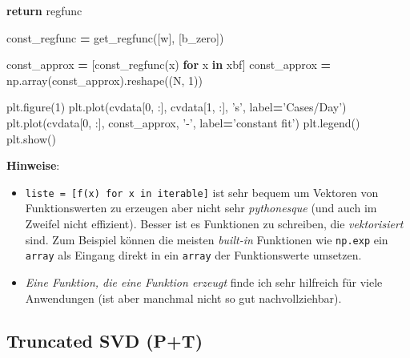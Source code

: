 \documentclass[]{book}
\newenvironment{Shaded}{\begin{snugshade}}{\end{snugshade}}
\newcommand{\ControlFlowTok}[1]{\textcolor[rgb]{0.13,0.29,0.53}{\textbf{#1}}}
\newcommand{\DecValTok}[1]{\textcolor[rgb]{0.00,0.00,0.81}{#1}}
\newcommand{\KeywordTok}[1]{\textcolor[rgb]{0.13,0.29,0.53}{\textbf{#1}}}
\newcommand{\NormalTok}[1]{#1}
\newcommand{\OperatorTok}[1]{\textcolor[rgb]{0.81,0.36,0.00}{\textbf{#1}}}
\newcommand{\StringTok}[1]{\textcolor[rgb]{0.31,0.60,0.02}{#1}}
\providecommand{\tightlist}{%
  \setlength{\itemsep}{0pt}\setlength{\parskip}{0pt}}
\theoremstyle{definition}
\theoremstyle{definition}
\theoremstyle{definition}
\theoremstyle{definition}
\theoremstyle{remark}
\begin{document}
\begin{Shaded}
\begin{Highlighting}[]
    \ControlFlowTok{return}\NormalTok{ regfunc}


\NormalTok{const_regfunc }\OperatorTok{=}\NormalTok{ get_regfunc([w], [b_zero])}

\NormalTok{const_approx }\OperatorTok{=}\NormalTok{ [const_regfunc(x) }\ControlFlowTok{for}\NormalTok{ x }\KeywordTok{in}\NormalTok{ xbf]}
\NormalTok{const_approx }\OperatorTok{=}\NormalTok{ np.array(const_approx).reshape((N, }\DecValTok{1}\NormalTok{))}

\NormalTok{plt.figure(}\DecValTok{1}\NormalTok{)}
\NormalTok{plt.plot(cvdata[}\DecValTok{0}\NormalTok{, :], cvdata[}\DecValTok{1}\NormalTok{, :], }\StringTok{'s'}\NormalTok{, label}\OperatorTok{=}\StringTok{'Cases/Day'}\NormalTok{)}
\NormalTok{plt.plot(cvdata[}\DecValTok{0}\NormalTok{, :], const_approx, }\StringTok{'-'}\NormalTok{, label}\OperatorTok{=}\StringTok{'constant fit'}\NormalTok{)}
\NormalTok{plt.legend()}
\NormalTok{plt.show()}
\end{Highlighting}
\end{Shaded}

\textbf{Hinweise}:

\begin{itemize}
\tightlist
\item
  \texttt{liste\ =\ {[}f(x)\ for\ x\ in\ iterable{]}} ist sehr bequem um Vektoren von Funktionswerten zu erzeugen aber nicht sehr \emph{pythonesque} (und auch im Zweifel nicht effizient). Besser ist es Funktionen zu schreiben, die \emph{vektorisiert} sind. Zum Beispiel können die meisten \emph{built-in} Funktionen wie \texttt{np.exp} ein \texttt{array} als Eingang direkt in ein \texttt{array} der Funktionswerte umsetzen.
\item
  \emph{Eine Funktion, die eine Funktion erzeugt} finde ich sehr hilfreich für viele Anwendungen (ist aber manchmal nicht so gut nachvollziehbar).
\end{itemize}

\hypertarget{truncated-svd-pt}{%
\subsection{Truncated SVD (P+T)}\label{truncated-svd-pt}}
\end{document}
